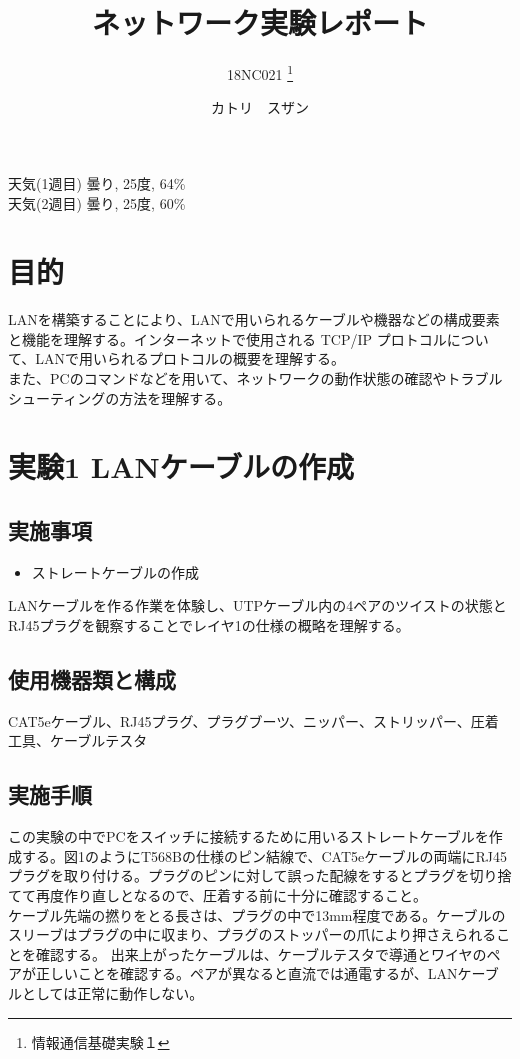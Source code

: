 \documentclass[10pt]{article}
\title{ネットワーク実験レポート}
\author{18NC021 \thanks{情報通信基礎実験１}}
\date{カトリ　スザン}
\begin{document}
\begin{titlepage}
	\maketitle
    \begin{center}
        天気(1週目) 曇り, 25度, 64\% \\
        天気(2週目) 曇り, 25度, 60\% 
    \end{center}
    
\end{titlepage}

\tableofcontents
\pagebreak

\section{目的}
LANを構築することにより、LANで用いられるケーブルや機器などの構成要素と機能を理解する。インターネットで使用される TCP/IP プロトコルについて、LANで用いられるプロトコルの概要を理解する。\\ また、PCのコマンドなどを用いて、ネットワークの動作状態の確認やトラブルシューティングの方法を理解する。

\section{実験1 LANケーブルの作成}

\subsection{実施事項}
\begin{itemize}
    \item ストレートケーブルの作成
\end{itemize}
LANケーブルを作る作業を体験し、UTPケーブル内の4ペアのツイストの状態とRJ45プラグを観察することでレイヤ1の仕様の概略を理解する。

\subsection{使用機器類と構成}
CAT5eケーブル、RJ45プラグ、プラグブーツ、ニッパー、ストリッパー、圧着工具、ケーブルテスタ 

\subsection{実施手順}
この実験の中でPCをスイッチに接続するために用いるストレートケーブルを作成する。図1のようにT568Bの仕様のピン結線で、CAT5eケーブルの両端にRJ45プラグを取り付ける。プラグのピンに対して誤った配線をするとプラグを切り捨てて再度作り直しとなるので、圧着する前に十分に確認すること。\\ ケーブル先端の撚りをとる長さは、プラグの中で13mm程度である。ケーブルのスリーブはプラグの中に収まり、プラグのストッパーの爪により押さえられることを確認する。 出来上がったケーブルは、ケーブルテスタで導通とワイヤのペアが正しいことを確認する。ペアが異なると直流では通電するが、LANケーブルとしては正常に動作しない。
\end{document}
